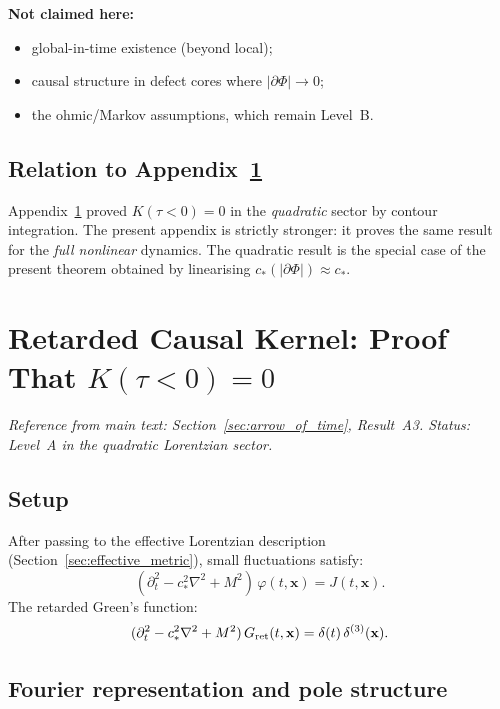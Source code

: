 \documentclass[11pt,a4paper]{article}
\numberwithin{equation}{section}
\begin{document}
\textbf{Not claimed here:}
\begin{itemize}
  \item global-in-time existence (beyond local);
  \item causal structure in defect cores where $|\partial\Phi|\to 0$;
  \item the ohmic/Markov assumptions, which remain Level~B.
\end{itemize}

\subsection*{Relation to Appendix~\ref{app:retarded_kernel}}

Appendix~\ref{app:retarded_kernel} proved $K(\tau<0)=0$ in the
\emph{quadratic} sector by contour integration.
The present appendix is strictly stronger: it proves the same result for
the \emph{full nonlinear} dynamics.
The quadratic result is the special case of the present theorem obtained
by linearising $c_*(|\partial\Phi|)\approx c_*$.


\section{Retarded Causal Kernel: Proof That $K(\tau<0)=0$}
\label{app:retarded_kernel}

\textit{Reference from main text: Section~\ref{sec:arrow_of_time},
Result~A3.
Status: Level~A in the quadratic Lorentzian sector.}

\subsection*{Setup}

After passing to the effective Lorentzian description
(Section~\ref{sec:effective_metric}), small fluctuations satisfy:
\begin{equation}
  (\partial_t^2-c_*^2\nabla^2+M^2)\,\varphi(t,\mathbf{x})=J(t,\mathbf{x}).
\end{equation}
The retarded Green's function:
\begin{equation}
  (\partial_t^2-c_*^2\nabla^2+M^2)\,G_{\rm ret}(t,\mathbf{x})
  =\delta(t)\,\delta^{(3)}(\mathbf{x}).
\end{equation}

\subsection*{Fourier representation and pole structure}
\end{document}
